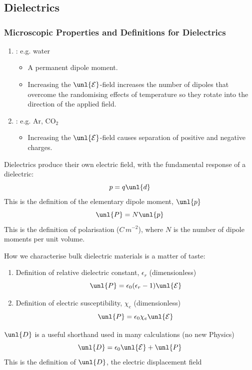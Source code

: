 \documentclass[a4paper, 11pt, normalem]{report}
\renewcommand\E{\mathcal{E}}
\newcommand\uE{\unl{\E}}
\newcommand\eno{\epsilon_0}
\newcommand\er{\epsilon_r}
\begin{document}
\chapter{}
\section{Dielectrics}
\subsection{Microscopic Properties and Definitions for Dielectrics}
\begin{enumerate}
    \item {}: e.g. water
    \begin{itemize}
        \item A permanent dipole moment.
        \item Increasing the $\uE$-field increases the number of dipoles that overcome the randomising effects of temperature so they rotate into the direction of the applied field.
    \end{itemize}
    \item {}: e.g. Ar, CO$_2$
    \begin{itemize}
        \item Increasing the $\uE$-field causes separation of positive and negative charges.
    \end{itemize}
\end{enumerate}
Dielectrics produce their own electric field, with the fundamental response of a dielectric:
\begin{equation}
    p = q\unl{d}
\end{equation}
This is the definition of the elementary dipole moment, $\unl{p}$
\begin{equation}
    \unl{P} = N\unl{p}
\end{equation}
This is the definition of polarisation ($C\,m^{-2}$), where $N$ is the number of dipole moments per unit volume.

How we characterise bulk dielectric materials is a matter of taste:
\begin{enumerate}
    \item Definition of relative dielectric constant, $\er$ (dimensionless)
    \begin{equation}
        \unl{P} = \eno(\er - 1)\uE
    \end{equation}
    \item Definition of electric susceptibility, $\chi_e$ (dimensionless)
    \begin{equation}
        \unl{P} = \eno\chi_e\uE
    \end{equation}
\end{enumerate}
$\unl{D}$ is a useful shorthand used in many calculations (no new Physics)
\begin{equation}
    \unl{D} = \eno\uE + \unl{P}
\end{equation}
This is the definition of $\unl{D}$, the electric displacement field
\end{document}
